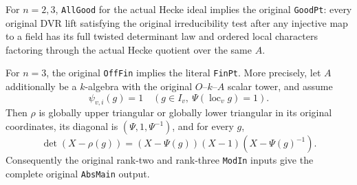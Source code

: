 \begin{theorem}
\label{thm:support-finite-points}
For $n=2,3$, \texttt{AllGood} for the actual Hecke ideal implies
the original \texttt{GoodPt}: every original DVR lift satisfying
the original irreducibility test after any injective map to a field
has its full twisted determinant law and ordered local characters
factoring through the actual Hecke quotient over the same $A$.

For $n=3$, the original \texttt{OffFin} implies the literal
\texttt{FinPt}.  More precisely, let $A$ additionally be a
$k$-algebra with the original $O$--$k$--$A$ scalar tower, and assume
\[
 \psi_{v,i}(g)=1\quad
 (g\in I_v,\ \Psi(\operatorname{loc}_vg)=1).                 \tag{FP2}
\]
Then $\rho$ is globally upper triangular or globally lower triangular
in its original coordinates, its diagonal is
$(\Psi,1,\Psi^{-1})$, and for every $g$,
\[
 \det(X-\rho(g))=(X-\Psi(g))(X-1)(X-\Psi(g)^{-1}).           \tag{FP3}
\]
Consequently the original rank-two and rank-three \texttt{ModIn}
inputs give the complete original \texttt{AbsMain} output.
\end{theorem}

